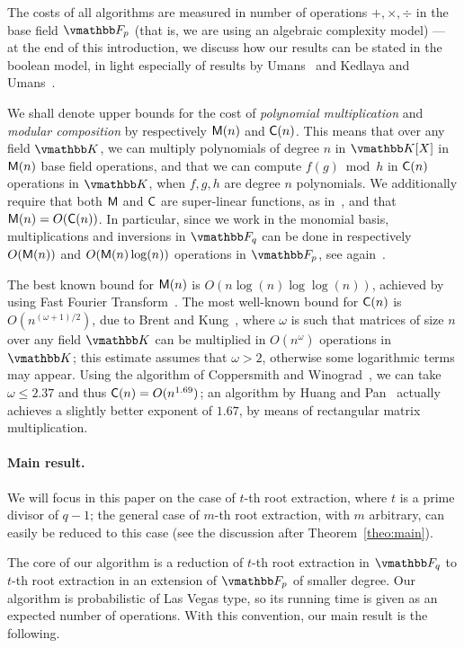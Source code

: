 The costs of all algorithms are measured in number of operations
$+,\times,\div$ in the base field $\F_p$ (that is, we are using an
algebraic complexity model) --- at the end of this introduction, we
discuss how our results can be stated in the boolean model, in light
especially of results by Umans~\cite{Umans08} and Kedlaya and
Umans~\cite{KeUm11}.

We shall denote upper bounds for the cost of {\em polynomial
  multiplication} and {\em modular composition} by respectively
$\mathsf{M}(n)$ and $\mathsf{C}(n)$. This means that over any field $\K$, we can
multiply polynomials of degree $n$ in $\K[X]$ in $\mathsf{M}(n)$ base field
operations, and that we can compute $f(g) \bmod h$ in $\mathsf{C}(n)$
operations in $\K$, when $f,g,h$ are degree $n$ polynomials. We
additionally require that both $\mathsf{M}$ and $\mathsf{C}$ are super-linear
functions, as in~\cite[Chapter~8]{GaGe03}, and that $\mathsf{M}(n)=O(\mathsf{C}(n))$.
In particular, since we work in the monomial basis, multiplications
and inversions in $\F_q$ can be done in respectively $O(\mathsf{M}(n))$ and
$O(\mathsf{M}(n)\log(n))$ operations in $\F_p$, see again~\cite{GaGe03}.

The best known bound for $\mathsf{M}(n)$ is $O(n\log(n)\log\log(n))$, achieved
by using Fast Fourier Transform~\cite{Schonhage1971,CaKa91}.  The most
well-known bound for $\mathsf{C}(n)$ is $O(n^{(\omega+1)/2})$, due to Brent
and Kung~\cite{BrKu78}, where $\omega$ is such that matrices of size
$n$ over any field $\K$ can be multiplied in $O(n^\omega)$ operations
in $\K$; this estimate assumes that $\omega > 2$, otherwise some
logarithmic terms may appear. Using the algorithm of Coppersmith and
Winograd~\cite{CoWi90}, we can take $\omega \le 2.37$ and thus
$\mathsf{C}(n)=O(n^{1.69})$; an algorithm by Huang and Pan~\cite{HuPa98}
actually achieves a slightly better exponent of $1.67$, by means of
rectangular matrix multiplication.

\paragraph{Main result.}
We will focus in this paper on the case of $t$-th root extraction,
where $t$ is a prime divisor of $q-1$; the general case of $m$-th root
extraction, with $m$ arbitrary, can easily be reduced to this case
(see the discussion after Theorem~\ref{theo:main}).

The core of our algorithm is a reduction of $t$-th root extraction in
$\F_q$ to $t$-th root extraction in an extension of $\F_p$ of smaller
degree. Our algorithm is probabilistic of Las Vegas type, so 
its running time is given as an expected number of operations. With
this convention, our main result is the following.

